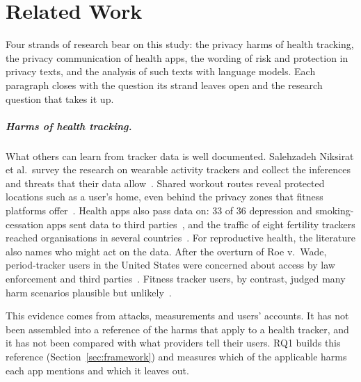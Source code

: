 \chapter{Related Work}
\label{ch:related-work}

Four strands of research bear on this study: the privacy harms of health
tracking, the privacy communication of health apps, the wording of risk and
protection in privacy texts, and the analysis of such texts with language
models. Each paragraph closes with the question its strand leaves open and the
research question that takes it up.

\paragraph{Harms of health tracking.} What others can learn from tracker data
is well documented. Salehzadeh Niksirat et al.\ survey the research on wearable
activity trackers and collect the inferences and threats that their data
allow~\parencite{niksirat2024wearable}. Shared workout routes reveal protected
locations such as a user's home, even behind the privacy zones that fitness
platforms offer~\parencite{hassan2018analysis,dhondt2022run}. Health apps also
pass data on: 33 of 36 depression and smoking-cessation apps sent data to third
parties~\parencite{huckvale2019assessment}, and the traffic of eight fertility
trackers reached organisations in several
countries~\parencite{hudig2025intimate}. For reproductive health, the
literature also names who might act on the data. After the overturn of Roe
v.~Wade, period-tracker users in the United States were concerned about access
by law enforcement and third parties~\parencite{cao2024deleted}. Fitness
tracker users, by contrast, judged many harm scenarios plausible but
unlikely~\parencite{gabriele2020understanding}.

This evidence comes from attacks, measurements and users' accounts. It has not been assembled into a
reference of the harms that apply to a health tracker, and it has not been
compared with what providers tell their users. RQ1 builds this reference
(Section~\ref{sec:framework}) and measures which of the applicable harms each
app mentions and which it leaves out.

